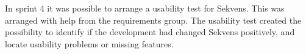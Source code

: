 In sprint 4 it was possible to arrange a usability test for Sekvens. This was arranged with help from the requirements group. The usability test created the possibility to identify if the development had changed Sekvens positively, and locate usability problems or missing features.